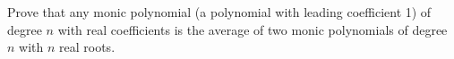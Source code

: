 Prove that any monic polynomial (a polynomial with leading coefficient 1) of degree $n$ with real coefficients is the average of two monic polynomials of degree $n$ with $n$ real roots.